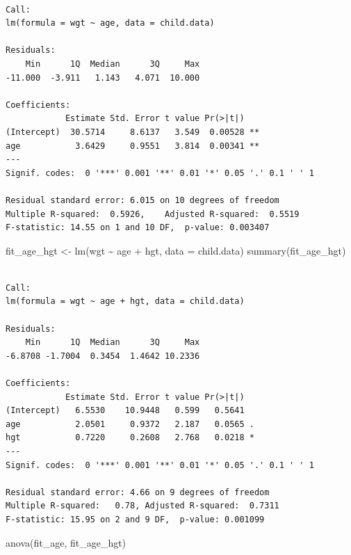 \documentclass[
  letterpaper,
]{scrbook}
\newenvironment{Shaded}{\begin{snugshade}}{\end{snugshade}}
\newcommand{\AttributeTok}[1]{\textcolor[rgb]{0.40,0.45,0.13}{#1}}
\newcommand{\FunctionTok}[1]{\textcolor[rgb]{0.28,0.35,0.67}{#1}}
\newcommand{\NormalTok}[1]{\textcolor[rgb]{0.00,0.23,0.31}{#1}}
\newcommand{\OtherTok}[1]{\textcolor[rgb]{0.00,0.23,0.31}{#1}}
\newcommand{\SpecialCharTok}[1]{\textcolor[rgb]{0.37,0.37,0.37}{#1}}
\begin{document}
\begin{verbatim}

Call:
lm(formula = wgt ~ age, data = child.data)

Residuals:
    Min      1Q  Median      3Q     Max 
-11.000  -3.911   1.143   4.071  10.000 

Coefficients:
            Estimate Std. Error t value Pr(>|t|)   
(Intercept)  30.5714     8.6137   3.549  0.00528 **
age           3.6429     0.9551   3.814  0.00341 **
---
Signif. codes:  0 '***' 0.001 '**' 0.01 '*' 0.05 '.' 0.1 ' ' 1

Residual standard error: 6.015 on 10 degrees of freedom
Multiple R-squared:  0.5926,    Adjusted R-squared:  0.5519 
F-statistic: 14.55 on 1 and 10 DF,  p-value: 0.003407
\end{verbatim}

\begin{Shaded}
\begin{Highlighting}[]
\NormalTok{fit\_age\_hgt }\OtherTok{\textless{}{-}} \FunctionTok{lm}\NormalTok{(wgt }\SpecialCharTok{\textasciitilde{}}\NormalTok{ age }\SpecialCharTok{+}\NormalTok{ hgt, }\AttributeTok{data =}\NormalTok{ child.data)}
\FunctionTok{summary}\NormalTok{(fit\_age\_hgt)}
\end{Highlighting}
\end{Shaded}

\begin{verbatim}

Call:
lm(formula = wgt ~ age + hgt, data = child.data)

Residuals:
    Min      1Q  Median      3Q     Max 
-6.8708 -1.7004  0.3454  1.4642 10.2336 

Coefficients:
            Estimate Std. Error t value Pr(>|t|)  
(Intercept)   6.5530    10.9448   0.599   0.5641  
age           2.0501     0.9372   2.187   0.0565 .
hgt           0.7220     0.2608   2.768   0.0218 *
---
Signif. codes:  0 '***' 0.001 '**' 0.01 '*' 0.05 '.' 0.1 ' ' 1

Residual standard error: 4.66 on 9 degrees of freedom
Multiple R-squared:   0.78, Adjusted R-squared:  0.7311 
F-statistic: 15.95 on 2 and 9 DF,  p-value: 0.001099
\end{verbatim}

\begin{Shaded}
\begin{Highlighting}[]
\FunctionTok{anova}\NormalTok{(fit\_age, fit\_age\_hgt)}
\end{Highlighting}
\end{Shaded}
\end{document}
